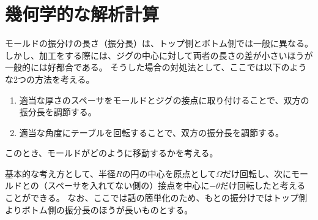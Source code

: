 \mainmatter





\tocPartSeparateline
\part{幾何学的な解析計算}


モールドの振分けの長さ（振分長）は、トップ側とボトム側では一般に異なる。
しかし、加工をする際には、ジグの中心に対して両者の長さの差が小さいほうが一般的には好都合である。
そうした場合の対処法として、ここでは以下のような2つの方法を考える。
\begin{enumerate}
\item
適当な厚さのスペーサをモールドとジグの接点に取り付けることで、双方の振分長を調節する。
\item
適当な角度にテーブルを回転することで、双方の振分長を調節する。
\end{enumerate}
このとき、モールドがどのように移動するかを考える。

基本的な考え方として、半径$R$の円の中心を原点として$\Omega$だけ回転し、次にモールドとの（スペーサを入れてない側の）接点を中心に$-\theta$だけ回転したと考えることができる。
なお、ここでは話の簡単化のため、もとの振分けではトップ側よりボトム側の振分長のほうが長いものとする。




